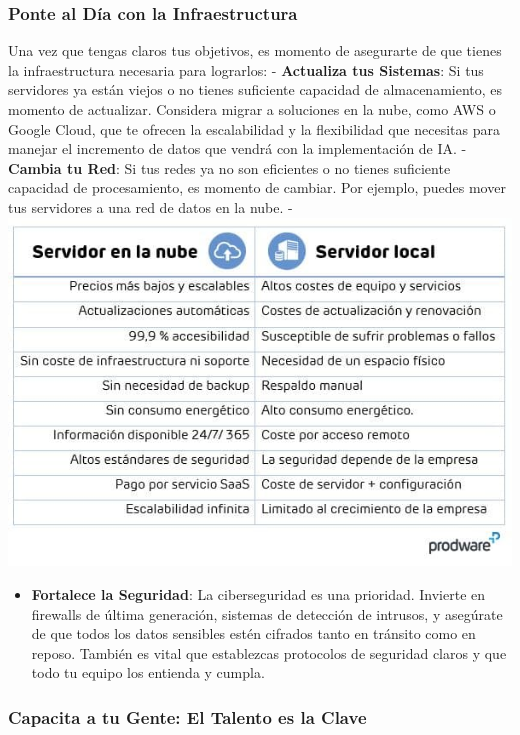 \documentclass[
  letterpaper,
]{book}
\providecommand{\tightlist}{%
  \setlength{\itemsep}{0pt}\setlength{\parskip}{0pt}}\usepackage{longtable,booktabs,array}
\begin{document}
\subsubsection{\texorpdfstring{\textbf{Ponte al Día con la
Infraestructura}}{Ponte al Día con la Infraestructura}}\label{ponte-al-duxeda-con-la-infraestructura}

Una vez que tengas claros tus objetivos, es momento de asegurarte de que
tienes la infraestructura necesaria para lograrlos: - \textbf{Actualiza
tus Sistemas}: Si tus servidores ya están viejos o no tienes suficiente
capacidad de almacenamiento, es momento de actualizar. Considera migrar
a soluciones en la nube, como AWS o Google Cloud, que te ofrecen la
escalabilidad y la flexibilidad que necesitas para manejar el incremento
de datos que vendrá con la implementación de IA. - \textbf{Cambia tu
Red}: Si tus redes ya no son eficientes o no tienes suficiente capacidad
de procesamiento, es momento de cambiar. Por ejemplo, puedes mover tus
servidores a una red de datos en la nube. -
\includegraphics{Img/cloud.jpg}

\begin{itemize}
\tightlist
\item
  \textbf{Fortalece la Seguridad}: La ciberseguridad es una prioridad.
  Invierte en firewalls de última generación, sistemas de detección de
  intrusos, y asegúrate de que todos los datos sensibles estén cifrados
  tanto en tránsito como en reposo. También es vital que establezcas
  protocolos de seguridad claros y que todo tu equipo los entienda y
  cumpla.
\end{itemize}

\subsubsection{\texorpdfstring{\textbf{Capacita a tu Gente: El Talento
es la
Clave}}{Capacita a tu Gente: El Talento es la Clave}}\label{capacita-a-tu-gente-el-talento-es-la-clave}
\end{document}
